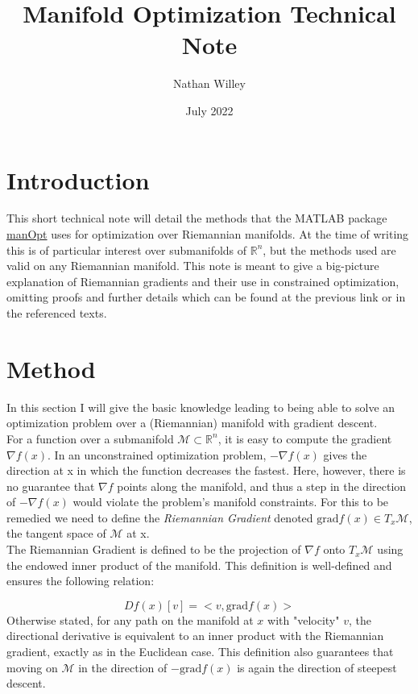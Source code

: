 \documentclass{article}
\title{Manifold Optimization Technical Note}
\author{Nathan Willey}
\date{July 2022}
\begin{document}
\maketitle

\section*{Introduction}

This short technical note will detail the methods that the MATLAB package \href{www.manopt.org}{manOpt} uses for optimization over Riemannian manifolds. At the time of writing this is of particular interest over submanifolds of $\mathbb{R}^n$, but the methods used are valid on any Riemannian manifold. This note is meant to give a big-picture explanation of Riemannian gradients and their use in constrained optimization, omitting proofs and further details which can be found at the previous link or in the referenced texts. 

\section*{Method}

In this section I will give the basic knowledge leading to being able to solve an optimization problem over a (Riemannian) manifold with gradient descent.\\

For a function over a submanifold $\mathcal{M} \subset \mathbb{R}^n$, it is easy to compute the gradient $\nabla f(x)$. In an unconstrained optimization problem, $-\nabla f(x)$ gives the direction at x in which the function decreases the fastest. Here, however, there is no guarantee that $\nabla f$ points along the manifold, and thus a step in the direction of $-\nabla f(x)$ would violate the problem's manifold constraints. For this to be remedied we need to define the \textit{Riemannian Gradient} denoted $\text{grad}f(x) \in T_x \mathcal{M}$, the tangent space of $\mathcal{M}$ at x.\\

The Riemannian Gradient is defined to be the projection of $\nabla f$ onto $T_x \mathcal{M}$ using the endowed inner product of the manifold. This definition is well-defined and ensures the following relation:

\[D f(x)[v] = <v, \text{grad}f(x)>\]
Otherwise stated, for any path on the manifold at $x$ with "velocity" $v$, the directional derivative is equivalent to an inner product with the Riemannian gradient, exactly as in the Euclidean case. This definition also guarantees that moving on $\mathcal{M}$ in the direction of $-\text{grad}f(x)$ is again the direction of steepest descent.\\
\end{document}
